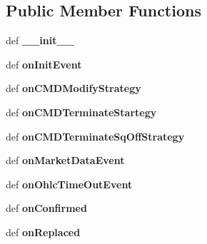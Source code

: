 \subsection*{Public Member Functions}
\begin{DoxyCompactItemize}
\item 
\hypertarget{classsampleStrategy_1_1sample_a824adf637925f01e6e95a68695e0a8df}{def {\bfseries \-\_\-\-\_\-init\-\_\-\-\_\-}}\label{classsampleStrategy_1_1sample_a824adf637925f01e6e95a68695e0a8df}

\item 
\hypertarget{classsampleStrategy_1_1sample_a0276042f0a48f1b13bb24d7c5a980f6a}{def {\bfseries on\-Init\-Event}}\label{classsampleStrategy_1_1sample_a0276042f0a48f1b13bb24d7c5a980f6a}

\item 
\hypertarget{classsampleStrategy_1_1sample_ae189229b773474fc8b01e519a3d1a354}{def {\bfseries on\-C\-M\-D\-Modify\-Strategy}}\label{classsampleStrategy_1_1sample_ae189229b773474fc8b01e519a3d1a354}

\item 
\hypertarget{classsampleStrategy_1_1sample_a8772d8f9aecaf9e7fb9f9a0aa087435d}{def {\bfseries on\-C\-M\-D\-Terminate\-Startegy}}\label{classsampleStrategy_1_1sample_a8772d8f9aecaf9e7fb9f9a0aa087435d}

\item 
\hypertarget{classsampleStrategy_1_1sample_ad24fe84a685be8bf30434275ff46700c}{def {\bfseries on\-C\-M\-D\-Terminate\-Sq\-Off\-Strategy}}\label{classsampleStrategy_1_1sample_ad24fe84a685be8bf30434275ff46700c}

\item 
\hypertarget{classsampleStrategy_1_1sample_a837817933dcbaa2bcf6c6d79a7f99a0d}{def {\bfseries on\-Market\-Data\-Event}}\label{classsampleStrategy_1_1sample_a837817933dcbaa2bcf6c6d79a7f99a0d}

\item 
\hypertarget{classsampleStrategy_1_1sample_a2d63e2ced58bf5712c1e6f7e85cf5cf5}{def {\bfseries on\-Ohlc\-Time\-Out\-Event}}\label{classsampleStrategy_1_1sample_a2d63e2ced58bf5712c1e6f7e85cf5cf5}

\item 
\hypertarget{classsampleStrategy_1_1sample_a80d7ffc2501684bf05ffb5f436eb106b}{def {\bfseries on\-Confirmed}}\label{classsampleStrategy_1_1sample_a80d7ffc2501684bf05ffb5f436eb106b}

\item 
\hypertarget{classsampleStrategy_1_1sample_a40b6a062417472d03b4631b7a27916f4}{def {\bfseries on\-Replaced}}\label{classsampleStrategy_1_1sample_a40b6a062417472d03b4631b7a27916f4}


\end{DoxyCompactItemize}
